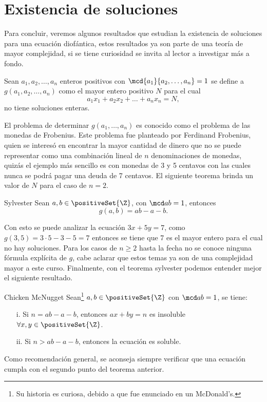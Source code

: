 \documentclass[12pt]{article}
\begin{document}
    \section{Existencia de soluciones}

    Para concluir, veremos algunos resultados que estudian la existencia de soluciones para una ecuación diofántica, estos
    resultados ya son parte de una teoría de mayor complejidad, si se tiene curiosidad se invita al lector a investigar más a fondo.

    \begin{definition.box}{}{}
        Sean  $a_1,a_2,\ldots,a_n$ enteros positivos con $\mcd{a_1}{a_2,\ldots,a_n} = 1$ se define a $g(a_1,a_2,\ldots,a_n)$
        como el mayor entero positivo $N$ para el cual
        \[
            a_1 x_1 + a_2 x_2 + \ldots + a_n x_n = N,
        \]
        no tiene soluciones enteras.
    \end{definition.box}

    El problema de determinar $g(a_1,\ldots,a_n)$ es conocido como el problema de las monedas de Frobenius.
    Este problema fue planteado por Ferdinand Frobenius, quien se interesó en encontrar la mayor cantidad de dinero que no
    se puede representar como una combinación lineal de $n$ denominaciones de monedas,
    quizás el ejemplo más sencillo es con monedas de 3 y 5 centavos con las cuales nunca se podrá pagar una deuda de 7 centavos.
    El siguiente teorema brinda un valor de $N$ para el caso de $n=2$.

    \begin{theorem.box}{Sylvester}{}
        Sean $a,b \in \positiveSet{\Z}$, con $\mcd a b = 1$, entonces
        \[
            g(a,b) = ab - a - b.
        \]
    \end{theorem.box}
    Con esto se puede analizar la ecuación $3x + 5y = 7$, como $g(3,5) = 3\cdot 5 - 3 - 5 = 7$
    entonces se tiene que 7 es el mayor entero para el cual no hay soluciones.
    Para los casos de $n\geq2$ hasta la fecha no se conoce ninguna fórmula explícita de $g$, cabe aclarar que estos temas
    ya son de una complejidad mayor a este curso.
    Finalmente, con el teorema sylvester podemos entender mejor el siguiente resultado.

    \begin{theorem.box}{Chicken McNugget}{}
    Sean\footnote{Su historia es curiosa, debido a que fue enunciado en un McDonald's.} $a, b\in \positiveSet{\Z}$ con $\mcd a b = 1$, se tiene:
    \begin{enumerate}
        \item[i.] Si $n = ab - a - b$, entonces $ax + by = n$ es insoluble $\forall x, y \in \positiveSet{\Z}$.
        \item[ii.] Si $n > ab - a - b$, entonces la ecuación es soluble.
    \end{enumerate}
    \end{theorem.box}
    Como recomendación general, se aconseja siempre verificar que una ecuación cumpla con el segundo punto del teorema anterior.
\end{document}
